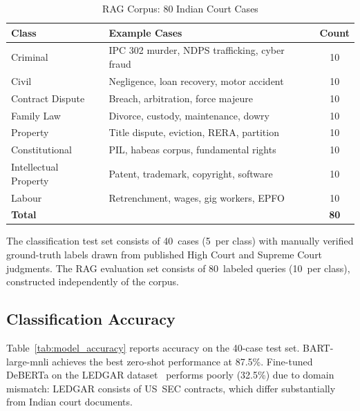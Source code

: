 \documentclass[conference]{IEEEtran}
\begin{document}
\begin{table}[ht]
\centering
\caption{RAG Corpus: 80 Indian Court Cases}
\label{tab:corpus}
\renewcommand{\arraystretch}{1.1}
\begin{tabular}{llc}
\toprule
\textbf{Class} & \textbf{Example Cases} & \textbf{Count} \\
\midrule
Criminal             & IPC 302 murder, NDPS trafficking, cyber fraud & 10 \\
Civil                & Negligence, loan recovery, motor accident     & 10 \\
Contract Dispute     & Breach, arbitration, force majeure            & 10 \\
Family Law           & Divorce, custody, maintenance, dowry          & 10 \\
Property             & Title dispute, eviction, RERA, partition       & 10 \\
Constitutional       & PIL, habeas corpus, fundamental rights        & 10 \\
Intellectual Property& Patent, trademark, copyright, software        & 10 \\
Labour               & Retrenchment, wages, gig workers, EPFO        & 10 \\
\midrule
\textbf{Total}       &                                               & \textbf{80} \\
\bottomrule
\end{tabular}
\end{table}

The classification test set consists of 40~cases (5~per class) with manually
verified ground-truth labels drawn from published High Court and Supreme Court
judgments. The RAG evaluation set consists of 80~labeled queries (10~per
class), constructed independently of the corpus.

\subsection{Classification Accuracy}

Table~\ref{tab:model_accuracy} reports accuracy on the 40-case test set.
BART-large-mnli achieves the best zero-shot performance at 87.5\%.
Fine-tuned DeBERTa on the LEDGAR dataset~\cite{leivaditi2020ledgar} performs
poorly (32.5\%) due to domain mismatch: LEDGAR consists of US~SEC contracts,
which differ substantially from Indian court documents.
\end{document}
